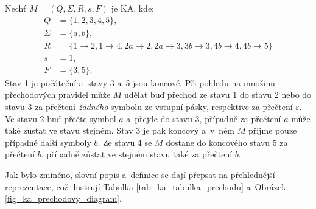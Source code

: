 \begin{example}\label{example_ka}
    Nechť $M = (Q, \Sigma, R, s, F)$ je KA, kde:
    \begin{align*}
        Q &= \{1, 2, 3, 4, 5\}, \\
        \Sigma &= \{a, b\}, \\
        R &= \{  1  \rightarrow 2, 1  \rightarrow 4,  2a \rightarrow 2, 2a \rightarrow 3, 3b \rightarrow 3, 4b \rightarrow 4, 4b \rightarrow 5\} \\
        s &= 1, \\
        F &= \{3, 5\}.
    \end{align*}
    Stav 1 je počáteční a~stavy 3 a~5 jsou koncové.
    Při pohledu na množinu přechodových pravidel může $M$ udělat buď přechod ze stavu 1 do stavu 2 nebo do stavu 3 za přečtení \emph{žádného} symbolu ze vstupní pásky, respektive za přečtení $\varepsilon$. 
    Ve stavu 2 buď přečte symbol $a$ a~přejde do stavu 3, případně za přečtení $a$ může také zůstat ve stavu stejném.
    Stav 3 je pak koncový a~v~něm $M$ přijme pouze případné další symboly $b$.
    Ze stavu 4 se $M$ dostane do koncového stavu 5 za přečtení $b$, případně zůstat ve stejném stavu také za přečtení $b$.
    
    Jak bylo zmíněno, slovní popis a~definice se dají přepsat na přehlednější reprezentace, což ilustrují Tabulka \ref{tab_ka_tabulka_prechodu} a~Obrázek \ref{fig_ka_prechodovy_diagram}. 


\end{example}
